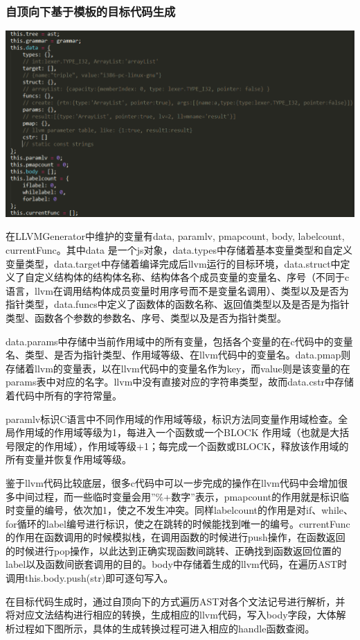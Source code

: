 \documentclass[a4paper]{article}
\begin{document}
\begin{CJK*}{UTF8}{gbsn}
    \subsubsection{自顶向下基于模板的目标代码生成}
    \begin{center}
    \includegraphics[width=6in]{param.png}
    \end{center}
    
    在LLVMGenerator中维护的变量有data, paramlv, pmapcount, body, labelcount, currentFunc。其中data 是一个js对象，data.types中存储着基本变量类型和自定义变量类型，data.target中存储着编译完成后llvm运行的目标环境，data.struct中定义了自定义结构体的结构体名称、结构体各个成员变量的变量名、序号（不同于c语言，llvm在调用结构体成员变量时用序号而不是变量名调用）、类型以及是否为指针类型，data.funcs中定义了函数体的函数名称、返回值类型以及是否是为指针类型、函数各个参数的参数名、序号、类型以及是否为指针类型。
	\par data.params中存储中当前作用域中的所有变量，包括各个变量的在c代码中的变量名、类型、是否为指针类型、作用域等级、在llvm代码中的变量名。data.pmap则存储着llvm的变量表，以在llvm代码中的变量名作为key，而value则是该变量的在params表中对应的名字。llvm中没有直接对应的字符串类型，故而data.cstr中存储着代码中所有的字符常量。

	\par paramlv标识C语言中不同作用域的作用域等级，标识方法同变量作用域检查。全局作用域的作用域等级为1，每进入一个函数或一个BLOCK 作用域（也就是大括号限定的作用域），作用域等级+1；每完成一个函数或BLOCK，释放该作用域的所有变量并恢复作用域等级。
	\par 鉴于llvm代码比较底层，很多c代码中可以一步完成的操作在llvm代码中会增加很多中间过程，而一些临时变量会用”\%+数字”表示，pmapcount的作用就是标识临时变量的编号，依次加1，使之不发生冲突。同样labelcount的作用是对if、while、for循环的label编号进行标识，使之在跳转的时候能找到唯一的编号。currentFunc的作用在函数调用的时候模拟栈，在调用函数的时候进行push操作，在函数返回的时候进行pop操作，以此达到正确实现函数间跳转、正确找到函数返回位置的label以及函数间嵌套调用的目的。body中存储着生成的llvm代码，在遍历AST时调用this.body.push(str)即可逐句写入。
	\par 在目标代码生成时，通过自顶向下的方式遍历AST对各个文法记号进行解析，并将对应文法结构进行相应的转换，生成相应的llvm代码，写入body字段，大体解析过程如下图所示，具体的生成转换过程可进入相应的handle函数查阅。


\end{CJK*}
\end{document}
